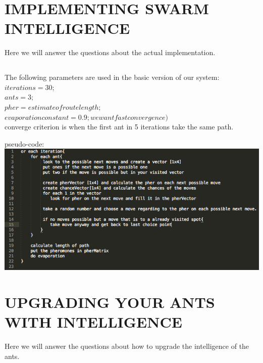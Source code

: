 \documentclass{scrartcl}
\begin{document}
 \section{IMPLEMENTING SWARM INTELLIGENCE}
 Here we will answer the questions about the actual implementation.
 
 \subsection{}
 The following parameters are used in the basic version of our system:\\
 $ iterations = 30; $\\
 $ ants = 3; $ \\
 $ pher = estimate of route length; $\\
 $ evaporation constant = 0.9;we want fast convergence) $\\ 
converge criterion is when the first ant in 5 iterations take the same path.\\
\pagebreak

pseudo-code:\\
\includegraphics[width=1\textwidth]{pseudo.PNG}

\pagebreak
\section{UPGRADING YOUR ANTS WITH INTELLIGENCE}
Here we will answer the questions about how to upgrade the intelligence of the ants.
\end{document}
